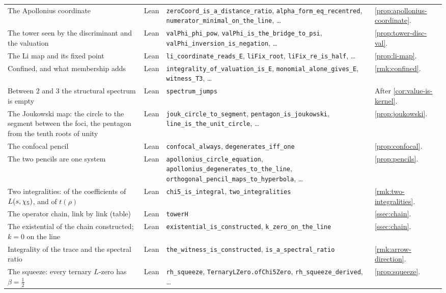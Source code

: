{\begin{longtable}{>{\raggedright\arraybackslash}p{}>{\raggedright\arraybackslash}p{}>{\raggedright\arraybackslash}p{}>{\raggedright\arraybackslash}p{}}
The Apollonius coordinate & Lean & \texttt{zeroCoord\_is\_a\_distance\_ratio}, \texttt{alpha\_form\_eq\_recentred}, \texttt{numerator\_minimal\_on\_the\_line}, \dots & \cref{prop:apollonius-coordinate}.\\
The tower seen by the discriminant and the valuation & Lean & \texttt{valPhi\_phi\_pow}, \texttt{valPhi\_is\_the\_bridge\_to\_psi}, \texttt{valPhi\_inversion\_is\_negation}, \dots & \cref{prop:tower-disc-val}.\\
The Li map and its fixed point & Lean & \texttt{li\_coordinate\_reads\_E}, \texttt{liFix\_root}, \texttt{liFix\_re\_is\_half}, \dots & \cref{prop:li-map}.\\
Confined, and what membership adds & Lean & \texttt{integrality\_of\_valuation\_is\_E}, \texttt{monomial\_alone\_gives\_E}, \texttt{witness\_T3}, \dots & \cref{rmk:confined}.\\
Between $2$ and $3$ the structural spectrum is empty & Lean & \texttt{spectrum\_jumps} & After \cref{cor:value-is-kernel}.\\
The Joukowski map: the circle to the segment between the foci, the pentagon from the tenth roots of unity & Lean & \texttt{jouk\_circle\_to\_segment}, \texttt{pentagon\_is\_joukowski}, \texttt{line\_is\_the\_unit\_circle}, \dots & \cref{prop:joukowski}.\\
The confocal pencil & Lean & \texttt{confocal\_always}, \texttt{degenerates\_iff\_one} & \cref{prop:confocal}.\\
The two pencils are one system & Lean & \texttt{apollonius\_circle\_equation}, \texttt{apollonius\_degenerates\_to\_the\_line}, \texttt{orthogonal\_pencil\_maps\_to\_hyperbola}, \dots & \cref{prop:pencils}.\\
Two integralities: of the coefficients of $L(s,\chi_5)$, and of $t(\rho)$ & Lean & \texttt{chi5\_is\_integral}, \texttt{two\_integralities} & \cref{rmk:two-integralities}.\\
The operator chain, link by link (table) & Lean & \texttt{towerH} & \cref{ssec:chain}.\\
The existential of the chain constructed; $k=0$ on the line & Lean & \texttt{existential\_is\_constructed}, \texttt{k\_zero\_on\_the\_line} & \cref{ssec:chain}.\\
Integrality of the trace and the spectral ratio & Lean & \texttt{the\_witness\_is\_constructed}, \texttt{is\_a\_spectral\_ratio} & \cref{rmk:arrow-direction}.\\
The squeeze: every ternary $L$-zero has $\beta=\tfrac12$ & Lean & \texttt{rh\_squeeze}, \texttt{TernaryLZero.ofChi5Zero}, \texttt{rh\_squeeze\_derived}, \dots & \cref{prop:squeeze}.\\

\end{longtable}}
